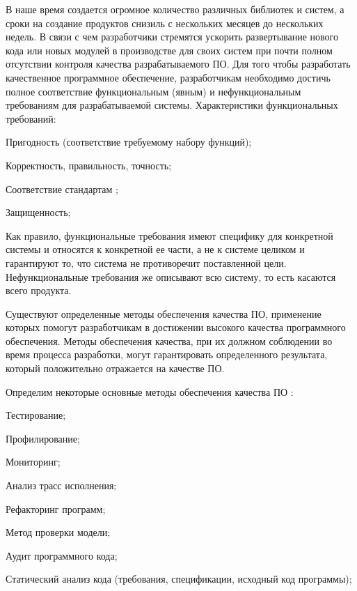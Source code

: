 \intro

В наше время создается огромное количество различных библиотек и систем, а сроки на создание продуктов снизиль с нескольких месяцев до нескольких недель.
В связи с чем разработчики стремятся ускорить развертывание нового кода или новых модулей в производстве для своих систем при почти полном отсутствии контроля качества разрабатываемого ПО.
Для того чтобы разработать качественное программное обеспечение, разработчикам необходимо достичь полное соответствие функциональным (явным) и нефункциональным требованиям для разрабатываемой системы.
Характеристики функциональных требований:
%
\begin{itemize*}
\item Пригодность (соответствие требуемому набору функций);
\item Корректность, правильность, точность;
\item Соответствие стандартам ;
\item Защищенность;
\end{itemize*}
%

Как правило, функциональные требования имеют специфику для конкретной системы и относятся к конкретной ее части, а не к системе целиком и гарантируют то, что система не противоречит поставленной цели.
Нефункциональные требования же описывают всю систему, то есть касаются всего продукта.

Существуют определенные методы обеспечения качества ПО, применение которых помогут разработчикам в достижении высокого качества программного обеспечения.
Методы обеспечения качества, при их должном соблюдении во время процесса разработки, могут гарантировать определенного результата, который положительно отражается на качестве ПО.

Определим некоторые основные методы обеспечения качества ПО \cite{PI_book}:
%
\begin{itemize*}
\item Тестирование;
\item Профилирование;
\item Мониторинг;
\item Анализ трасс исполнения;
\item Рефакторинг программ;
\item Метод проверки модели;
\item Аудит программного кода;
\item Статический анализ кода (требования, спецификации, исходный код программы);
\end{itemize*}

